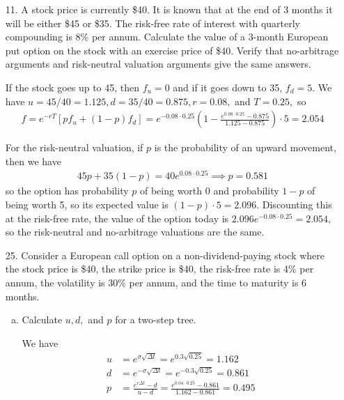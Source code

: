 \documentclass{article}
\begin{document}
\begin{itemize}
	\item[11.] A stock price is currently \$40. It is known that at the end of 3 months it will be either \$45 or \$35. The risk-free rate of interest with quarterly compounding is 8\% per annum. Calculate the value of a 3-month European put option on the stock with an exercise price of \$40. Verify that no-arbitrage arguments and risk-neutral valuation arguments give the same answers.
		\begin{soln}
			If the stock goes up to 45, then $f_u=0$ and if it goes down to 35, $f_d=5.$ We have $u=45/40 = 1.125, d = 35/40 = 0.875, r=0.08,$ and $T=0.25,$ so
			\begin{align*}
				f = e^{-rT}[pf_u + (1-p)f_d] = e^{-0.08\cdot 0.25} \left(1 - \frac{e^{0.08\cdot 0.25}-0.875}{1.125-0.875} \right) \cdot 5 = \boxed{2.054}
			\end{align*}

			For the risk-neutral valuation, if $p$ is the probability of an upward movement, then we have
			\begin{align*}
				45p + 35(1-p) = 40e^{0.08\cdot 0.25} \implies p = 0.581
			\end{align*}
			so the option has probability $p$ of being worth 0 and probability $1-p$ of being worth 5, so its expected value is $(1-p)\cdot 5 = 2.096.$ Discounting this at the risk-free rate, the value of the option today is $2.096e^{-0.08\cdot 0.25} = 2.054,$ so the risk-neutral and no-arbitrage valuations are the same.
		\end{soln}

	\item[25.] Consider a European call option on a non-dividend-paying stock where the stock price is \$40, the strike price is \$40, the risk-free rate is 4\% per annum, the volatility is 30\% per annum, and the time to maturity is 6 months. 
		\begin{enumerate}[(a)]
			\item Calculate $u, d,$ and $p$ for a two-step tree.
				\begin{soln}
					We have
					\begin{align*}
						u &= e^{\sigma\sqrt{\Delta t}} = e^{0.3\sqrt{0.25}} = 1.162 \\
						d &= e^{-\sigma\sqrt{\Delta t}} = e^{-0.3\sqrt{0.25}} = 0.861 \\
						p &= \frac{e^{r\Delta t}-d}{u-d} = \frac{e^{0.04\cdot 0.25}-0.861}{1.162-0.861} = 0.495
					\end{align*}
				\end{soln}


\end{enumerate}
\end{itemize}
\end{document}

